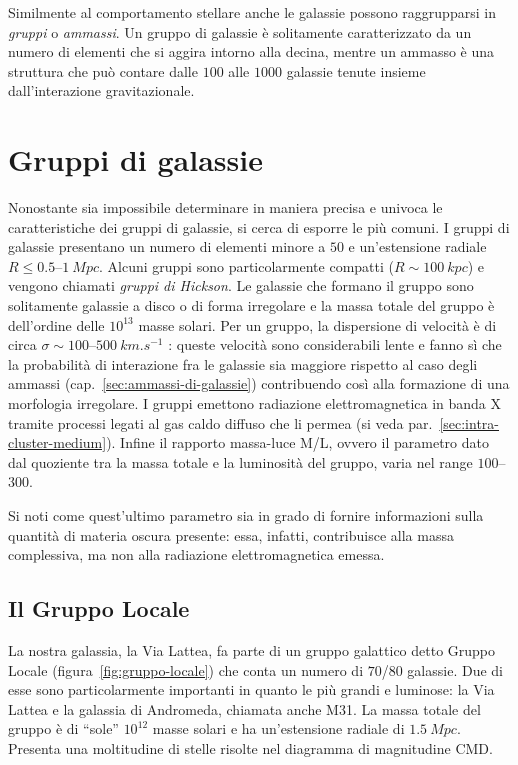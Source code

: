 Similmente al comportamento stellare anche le galassie possono raggrupparsi in \emph{gruppi} o \emph{ammassi}.
Un gruppo di galassie è solitamente caratterizzato da un numero di elementi che si aggira intorno alla decina, mentre un ammasso è una struttura che può contare dalle $100$ alle $1000$ galassie tenute insieme dall’interazione gravitazionale.

\section{Gruppi di galassie}\label{sec:gruppi-di-galassie}
Nonostante sia impossibile determinare in maniera precisa e univoca le caratteristiche dei gruppi di galassie, si cerca di esporre le più comuni. 
I gruppi di galassie presentano un numero di elementi minore a $50$ e un’estensione radiale $R \leq 0.5$--$\SI{1}{Mpc}$. Alcuni gruppi sono particolarmente compatti ($R \sim \SI{100}{kpc}$) e vengono chiamati \emph{gruppi di Hickson}. 
Le galassie che formano il gruppo sono solitamente galassie a disco o di forma irregolare e la massa totale del gruppo è dell’ordine delle $10^{13}$ masse solari. 
Per un gruppo, la dispersione di velocità è di circa $\sigma \sim 100$--$\SI{500}{km.s^{-1}}$ : queste velocità sono considerabili lente e fanno sì che la probabilità di interazione fra le galassie sia maggiore rispetto al caso degli ammassi (cap.~\ref{sec:ammassi-di-galassie}) contribuendo così alla formazione di una morfologia irregolare.
I gruppi emettono radiazione elettromagnetica in banda X tramite processi legati al gas caldo diffuso che li permea (si veda par.~\ref{sec:intra-cluster-medium}).
Infine il rapporto massa-luce M/L, ovvero il parametro dato dal quoziente tra la massa totale e la luminosità del gruppo, varia nel range $100$--$300$.

\noindent Si noti come quest’ultimo parametro sia in grado di fornire informazioni sulla quantità di materia oscura presente: essa, infatti, contribuisce alla massa complessiva, ma non alla radiazione elettromagnetica emessa. 
\subsection{Il Gruppo Locale}
La nostra galassia, la Via Lattea, fa parte di un gruppo galattico detto Gruppo Locale (figura~\ref{fig:gruppo-locale}) che conta un numero di $70$/$80$ galassie. Due di esse sono particolarmente importanti in quanto le più grandi e luminose: la Via Lattea e la galassia di Andromeda, chiamata anche M31.
La massa totale del gruppo è di “sole” $10^{12}$ masse solari e ha un’estensione radiale di $\SI{1.5}{Mpc}$.
Presenta una moltitudine di stelle risolte nel diagramma di magnitudine CMD.

